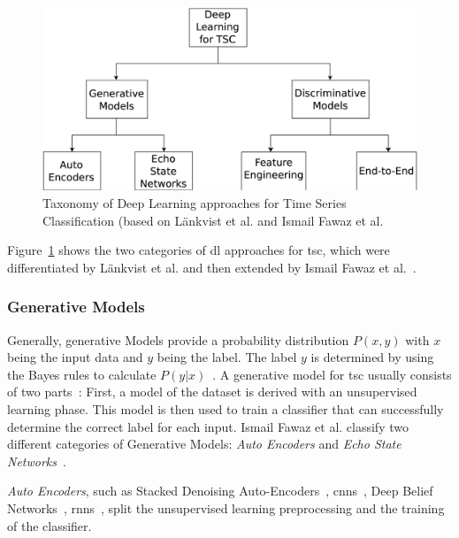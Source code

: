 \begin{figure}
    \center
    \includegraphics[width=\columnwidth]{fig/deep_learning_approaches.pdf}
    \caption{Taxonomy of Deep Learning approaches for Time Series Classification (based on L\"ankvist et al. and Ismail Fawaz et al.~\cite{langkvist2014review,ismail2019deep}}
    \label{fig:deep_learning_approaches}
\end{figure}

Figure~\ref{fig:deep_learning_approaches} shows the two categories of \ac{dl} approaches for \ac{tsc}, which were differentiated by L\"ankvist et al. and then extended by Ismail Fawaz et al.~\cite{langkvist2014review,ismail2019deep}.

\subsubsection*{Generative Models}
Generally, generative Models provide a probability distribution $P(x,y)$ with $x$ being the input data and $y$ being the label.
The label $y$ is determined by using the Bayes rules to calculate $P(y|x)$~\cite{ng2001discriminative}.
A generative model for \ac{tsc} usually consists of two parts~\cite{langkvist2014review}: First, a model of the dataset is derived with an unsupervised learning phase.
This model is then used to train a classifier that can successfully determine the correct label for each input.
Ismail Fawaz et al. classify two different categories of Generative Models: \textit{Auto Encoders} and \textit{Echo State Networks}~\cite{ismail2019deep}.

\textit{Auto Encoders}, such as Stacked Denoising Auto-Encoders~\cite{bengio2013generalized}, \acp{cnn}~\cite{song2020representation}, Deep Belief Networks~\cite{banerjee2019deep}, \acp{rnn}~\cite{rajan2018generative}, split the unsupervised learning preprocessing
and the training of the classifier.

